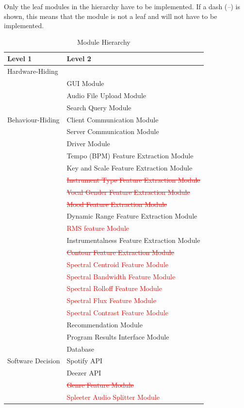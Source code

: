 \documentclass[12pt, titlepage]{article}
\begin{document}
Only the leaf modules in the hierarchy have to be implemented. If a dash
(\emph{--}) is shown, this means that the module is not a leaf and will not have
to be implemented.

\begin{table}[h!]
  \centering
  \begin{tabular}{p{} p{}}
  \toprule
  \textbf{Level 1} & \textbf{Level 2}\\
  \midrule
  
  {Hardware-Hiding} & ~ \\
  \midrule
  
  \multirow{7}{0.3\textwidth}{Behaviour-Hiding} & GUI Module\\
  & Audio File Upload Module\\
  & Search Query Module\\
  & Client Communication Module\\
  & Server Communication Module\\
  & Driver Module\\
  & Tempo (BPM) Feature Extraction Module\\
  & Key and Scale Feature Extraction Module\\
  & \textcolor{red}{\st{Instrument Type Feature Extraction Module}}\\
  & \textcolor{red}{\st{Vocal Gender Feature Extraction Module}}\\
  & \textcolor{red}{\st{Mood Feature Extraction Module}}\\
  & Dynamic Range Feature Extraction Module\\
  & \textcolor{red}{RMS feature Module}\\
  & Instrumentalness Feature Extraction Module\\
  & \textcolor{red}{\st{Contour Feature Extraction Module}}\\
  & \textcolor{red}{Spectral Centroid Feature Module}\\
  & \textcolor{red}{Spectral Bandwidth Feature Module}\\
  & \textcolor{red}{Spectral Rolloff Feature Module}\\
  & \textcolor{red}{Spectral Flux Feature Module}\\
  & \textcolor{red}{Spectral Contrast Feature Module}\\
  & Recommendation Module\\
  & Program Results Interface Module\\
  \midrule
  
  \multirow{3}{0.3\textwidth}{Software Decision} & Database\\
  & Spotify API\\
  & Deezer API\\
  & \textcolor{red}{\st{Genre Feature Module}}\\
  & \textcolor{red}{Spleeter Audio Splitter Module}\\
  \bottomrule
  
  \end{tabular}
  \caption{Module Hierarchy}
  \label{TblMH}
  \end{table}
\end{document}
